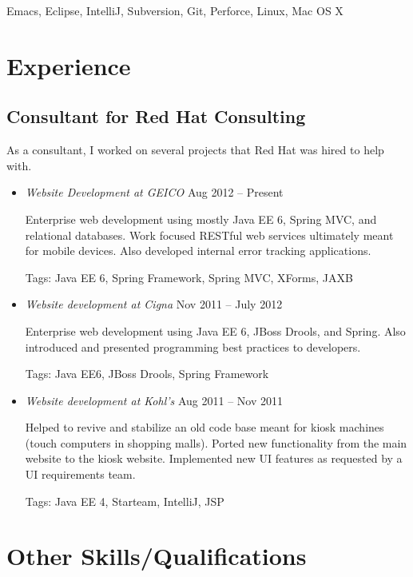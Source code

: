 \documentclass[a4paper]{article}
\begin{document}
  Emacs, Eclipse, IntelliJ, Subversion, Git, Perforce, Linux, Mac OS X

\section*{Experience}

\subsection*{Consultant for Red Hat Consulting}

  As a consultant, I worked on several projects that Red Hat was hired to help
  with.

  \vskip 5pt
  \begin{itemize}

    \item \textsl{Website Development at GEICO} \hfill Aug 2012 -- Present

      Enterprise web development using mostly Java EE 6, Spring MVC, and
      relational databases. Work focused RESTful web services ultimately meant
      for mobile devices. Also developed internal error tracking applications.

      Tags: Java EE 6, Spring Framework, Spring MVC, XForms, JAXB

    \item \textsl{Website development at Cigna} \hfill Nov 2011 -- July
      2012

      Enterprise web development using Java EE 6, JBoss Drools, and Spring. Also
      introduced and presented programming best practices to developers.

      Tags: Java EE6, JBoss Drools, Spring Framework

    \item \textsl{Website development at Kohl's} \hfill Aug 2011 -- Nov 2011

      Helped to revive and stabilize an old code base meant for kiosk machines
      (touch computers in shopping malls). Ported new functionality from the
      main website to the kiosk website. Implemented new UI features as
      requested by a UI requirements team.

      Tags: Java EE 4, Starteam, IntelliJ, JSP

  \end{itemize}

\section*{Other Skills/Qualifications}
\end{document}
